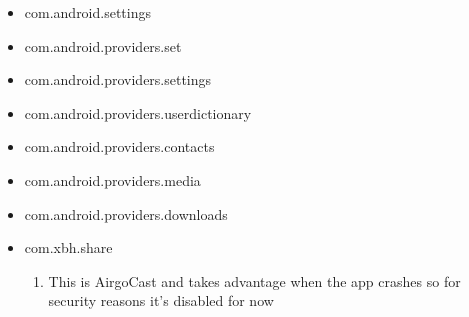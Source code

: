 

\begin{itemize}

    \item com.android.settings
    \item com.android.providers.set
    \item com.android.providers.settings
    \item com.android.providers.userdictionary
    \item com.android.providers.contacts
    \item com.android.providers.media
    \item com.android.providers.downloads
    \item com.xbh.share
        \begin{enumerate}
            \item This is AirgoCast and takes advantage when the app crashes so for security reasons it's disabled for now
        \end{enumerate}
\end{itemize}







